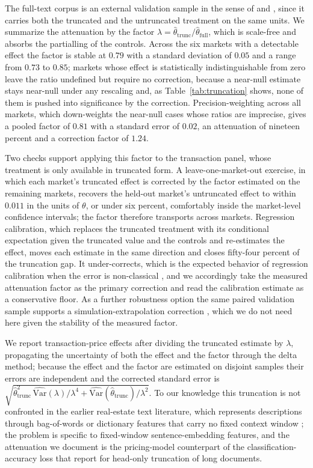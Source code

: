 The full-text corpus is an external validation sample in the sense of
\citet{chen2008semiparametric} and \citet{carroll2006measurement}, since it carries
both the truncated and the untruncated treatment on the same units. We summarize the
attenuation by the factor $\lambda = \hat\theta_{\text{trunc}}/\hat\theta_{\text{full}}$,
which is scale-free and absorbs the partialling of the controls. Across the six
markets with a detectable effect the factor is stable at $0.79$ with a standard
deviation of $0.05$ and a range from $0.73$ to $0.85$; markets whose effect is
statistically indistinguishable from zero leave the ratio undefined but require no
correction, because a near-null estimate stays near-null under any rescaling and,
as Table~\ref{tab:truncation} shows, none of them is pushed into significance by the
correction. Precision-weighting across all markets, which down-weights the
near-null cases whose ratios are imprecise, gives a pooled factor of $0.81$ with a
standard error of $0.02$, an attenuation of nineteen percent and a correction
factor of $1.24$.

Two checks support applying this factor to the transaction panel, whose treatment
is only available in truncated form. A leave-one-market-out exercise, in which each
market's truncated effect is corrected by the factor estimated on the remaining
markets, recovers the held-out market's untruncated effect to within $0.011$ in the
units of $\theta$, or under six percent, comfortably inside the market-level
confidence intervals; the factor therefore transports across markets. Regression
calibration, which replaces the truncated treatment with its conditional expectation
given the truncated value and the controls and re-estimates the effect, moves each
estimate in the same direction and closes fifty-four percent of the truncation gap.
It under-corrects, which is the expected behavior of regression calibration when the
error is non-classical \citep{carroll2006measurement}, and we accordingly take the
measured attenuation factor as the primary correction and read the calibration
estimate as a conservative floor. As a further robustness option the same paired
validation sample supports a simulation-extrapolation correction
\citep{cook1994simex}, which we do not need here given the stability of the measured
factor.

We report transaction-price effects after dividing the truncated estimate by
$\lambda$, propagating the uncertainty of both the effect and the factor through the
delta method; because the effect and the factor are estimated on disjoint samples
their errors are independent and the corrected standard error is
$\sqrt{\hat\theta_{\text{trunc}}^2\,\widehat{\mathrm{Var}}(\lambda)/\lambda^4
+ \widehat{\mathrm{Var}}(\hat\theta_{\text{trunc}})/\lambda^2}$. To our knowledge
this truncation is not confronted in the earlier real-estate text literature, which
represents descriptions through bag-of-words or dictionary features that carry no
fixed context window \citep{nowak2017textual, shen2021information}; the problem is
specific to fixed-window sentence-embedding features, and the attenuation we
document is the pricing-model counterpart of the classification-accuracy loss that
\citet{sun2019finetune} report for head-only truncation of long documents.

